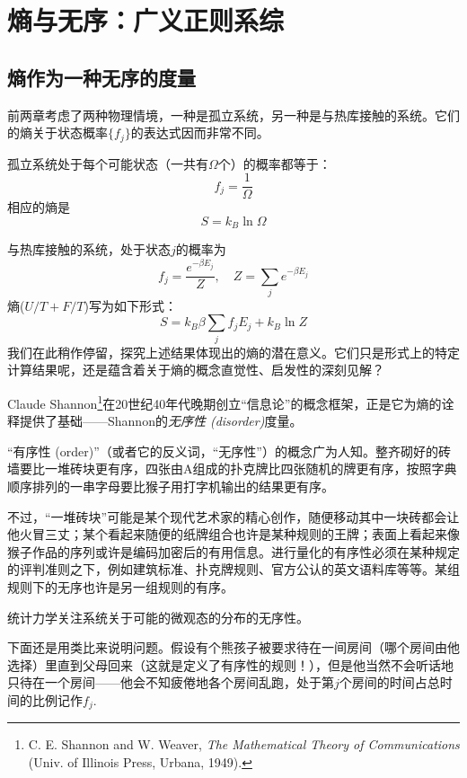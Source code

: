 \chapter{熵与无序：广义正则系综}\label{chap17}
\section{熵作为一种无序的度量}
\label{sec17.1}
前两章考虑了两种物理情境，一种是孤立系统，另一种是与热库接触的系统。它们的熵关于状态概率$\{ f_j \}$的表达式因而非常不同。

孤立系统处于每个可能状态（一共有$\Omega$个）的概率都等于：
\begin{equation}
	f_j = \frac{1}{\Omega}
\label{equ17.1}
\end{equation}
相应的熵是
\begin{equation}
	S = k_B \ln \Omega
\label{equ17.2}
\end{equation}

与热库接触的系统，处于状态$j$的概率为
\begin{equation}
	f_j = \frac{e^{-\beta E_j}}{Z}, \quad Z = \sum_j e^{-\beta E_j}
\label{equ17.3}
\end{equation}
熵($U/T + F/T$)写为如下形式：
\begin{equation}
	S = k_B \beta \sum_j f_j E_j + k_B \ln Z
\label{equ17.4}
\end{equation}
我们在此稍作停留，探究上述结果体现出的熵的潜在意义。它们只是形式上的特定计算结果呢，还是蕴含着关于熵的概念直觉性、启发性的深刻见解？

Claude Shannon\footnote{C. E. Shannon and W. Weaver, {\it The Mathematical Theory of Communications} (Univ. of Illinois Press, Urbana, 1949).}在20世纪40年代晚期创立“信息论”的概念框架，正是它为熵的诠释提供了基础——Shannon的{\it 无序性 (disorder)}度量。

“有序性 (order)”（或者它的反义词，“无序性”）的概念广为人知。整齐砌好的砖墙要比一堆砖块更有序，四张由A组成的扑克牌比四张随机的牌更有序，按照字典顺序排列的一串字母要比猴子用打字机输出的结果更有序。

不过，“一堆砖块”可能是某个现代艺术家的精心创作，随便移动其中一块砖都会让他火冒三丈；某个看起来随便的纸牌组合也许是某种规则的王牌；表面上看起来像猴子作品的序列或许是编码加密后的有用信息。进行量化的有序性必须在某种规定的评判准则之下，例如建筑标准、扑克牌规则、官方公认的英文语料库等等。某组规则下的无序也许是另一组规则的有序。

统计力学关注系统关于可能的微观态的分布的无序性。

下面还是用类比来说明问题。假设有个熊孩子被要求待在一间房间（哪个房间由他选择）里直到父母回来（这就是定义了有序性的规则！），但是他当然不会听话地只待在一个房间——他会不知疲倦地各个房间乱跑，处于第$j$个房间的时间占总时间的比例记作$f_j$.

